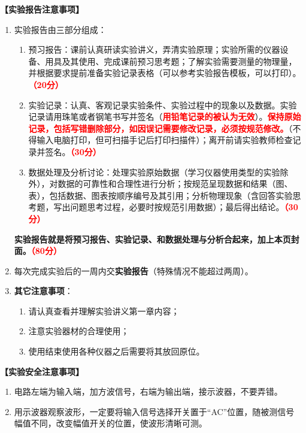 \documentclass[dvipsnames, svgnames,a4paper,11pt]{article}
\begin{document}
	\textbf{【实验报告注意事项】}
	\begin{enumerate}
		\item 实验报告由三部分组成：
		\begin{enumerate}
			\item 预习报告：课前认真研读实验讲义，弄清实验原理；实验所需的仪器设备、用具及其使用、完成课前预习思考题；了解实验需要测量的物理量，并根据要求提前准备实验记录表格（可以参考实验报告模板，可以打印）。\textcolor{red}{\textbf{（20分）}}
			\item 实验记录：认真、客观记录实验条件、实验过程中的现象以及数据。实验记录请用珠笔或者钢笔书写并签名（\textcolor{red}{\textbf{用铅笔记录的被认为无效}}）。\textcolor{red}{\textbf{保持原始记录，包括写错删除部分，如因误记需要修改记录，必须按规范修改。}}（不得输入电脑打印，但可扫描手记后打印扫描件）；离开前请实验教师检查记录并签名。\textcolor{red}{\textbf{（30分）}}
			\item 数据处理及分析讨论：处理实验原始数据（学习仪器使用类型的实验除外），对数据的可靠性和合理性进行分析；按规范呈现数据和结果（图、表），包括数据、图表按顺序编号及其引用；分析物理现象（含回答实验思考题，写出问题思考过程，必要时按规范引用数据）；最后得出结论。\textcolor{red}{\textbf{（30分）}}
		\end{enumerate}
		\textbf{实验报告就是将预习报告、实验记录、和数据处理与分析合起来，加上本页封面。\textcolor{red}{（80分）}}
		\item 每次完成实验后的一周内交\textbf{实验报告}（特殊情况不能超过两周）。
		\item \textbf{其它注意事项}：
		\begin{enumerate}
			\item 请认真查看并理解实验讲义第一章内容；
			\item 注意实验器材的合理使用；
			\item 使用结束使用各种仪器之后需要将其放回原位。
		\end{enumerate}
	\end{enumerate}
	
	\textbf{【实验安全注意事项】}	
	\begin{enumerate}
		\item 电路左端为输入端，加方波信号，右端为输出端，接示波器，不要弄错。
		\item 用示波器观察波形，一定要将输入信号选择开关置于“AC”位置，随被测信号幅值不同，改变幅值开关的位置，使波形清晰可测。
		
	\end{enumerate}
	
	
\end{document}
